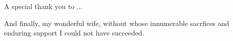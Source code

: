 

A special thank you to ...

And finally, my wonderful wife, without whose innumerable sacrfices and enduring support I could not have succeeded.
